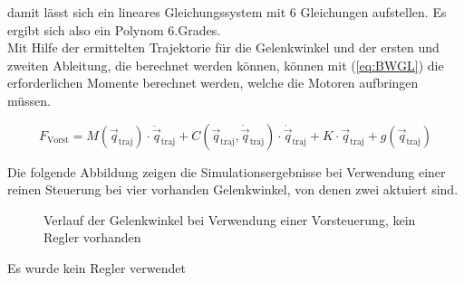 damit lässt sich ein lineares Gleichungssystem mit 6 Gleichungen aufstellen. Es ergibt sich also ein Polynom 6.Grades.\\
Mit Hilfe der ermittelten Trajektorie für die Gelenkwinkel und der ersten und zweiten Ableitung, die berechnet werden können, können mit (\ref{eq:BWGL}) die erforderlichen Momente berechnet werden, welche die Motoren aufbringen müssen.

\begin{equation}
F_\mathrm{Vorst} = M(\vec{q}_{\mathrm{traj}})\cdot\ddot{\vec{q}}_{\mathrm{traj}}+C(\vec{q}_{\mathrm{traj}},\dot{\vec{q}}_{\mathrm{traj}})\cdot\dot{\vec{q}}_{\mathrm{traj}}+K\cdot{\vec{q}}_{\mathrm{traj}}+g(\vec{q}_{\mathrm{traj}}) 
\end{equation}

Die folgende Abbildung zeigen die Simulationsergebnisse bei Verwendung einer reinen Steuerung bei vier vorhanden Gelenkwinkel, von denen zwei aktuiert sind. 
\begin{figure}[h!]
\centering
\scalebox{0.75}{}
\caption{Verlauf der Gelenkwinkel bei Verwendung einer Vorsteuerung, kein Regler vorhanden}
\end{figure}

Es wurde kein Regler verwendet

%
